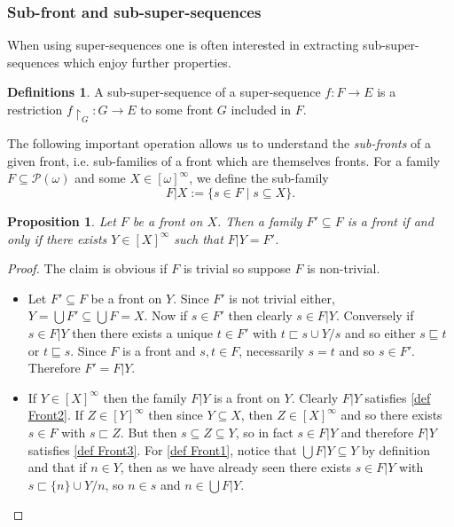 \documentclass{article}%
\theoremstyle{plain}
\newtheorem{proposition}[theorem]{Proposition}
\theoremstyle{definition}
\newtheorem{definition}[theorem]{Definition}
\newtheorem{definition}[theorem]{Notation}
\newtheorem{definition}[theorem]{Notations}
\newtheorem{definition}[theorem]{Definitions}
\theoremstyle{remark}
\newcommand{\restr}[1]{\mathord{\upharpoonright_{#1}}} %
\DeclareMathOperator{\base}{\mathord{\bigcup}}
\newcommand{\segm} {\sqsubseteq}
\newcommand{\segs} {\sqsubset}
\newcommand{\infSub}[1]{[#1]^{\infty}}
\begin{document}
\subsubsection{Sub-front and sub-super-sequences}

When using super-sequences one is often interested in extracting sub-super-sequences which enjoy further properties.

\begin{definition}
A sub-super-sequence of a super-sequence $f:F\to E$ is a restriction $f\restr{G}:G\to E$ to some front $G$ included in $F$.
\end{definition}


The following important operation allows us to understand the \emph{sub-fronts} of a given front, i.e. sub-families of a front which are themselves fronts. For a family $F\subseteq \mathcal{P}(\omega)$ and some $X\in\infSub{\omega}$, we define the sub-family
\[
F|X:=\{s\in F\mid s\subseteq X\}.
\]

\begin{proposition}
Let $F$ be a front on $X$. Then a family $F'\subseteq F$ is a front if and only if there exists $Y\in\infSub{X}$ such that $F|Y=F'$.
\end{proposition}
\begin{proof}
The claim is obvious if $F$ is trivial so suppose $F$ is non-trivial.
\begin{itemize}
\item[$\to$] Let $F'\subseteq F$ be a front on $Y$. Since $F'$ is not trivial either, $Y=\base F'\subseteq \base F=X$. Now if $s\in F'$ then clearly $s\in F|Y$. Conversely if $s\in F|Y$ then there exists a unique $t\in F'$ with $t\segs s \cup Y/s$ and so either $s\segm t$ or $t\segm s$. Since $F$ is a front and $s,t\in F$, necessarily $s=t$ and so $s\in F'$. Therefore $F'=F|Y$.
\item[$\leftarrow$] If $Y\in\infSub{X}$ then the family $F|Y$ is a front on $Y$. Clearly $F|Y$ satisfies \cref{def Front2}. If $Z\in \infSub{Y}$ then since $Y\subseteq X$, then $Z\in\infSub{X}$ and so there exists $s\in F$ with $s\segs Z$. But then $s\subseteq Z\subseteq Y$, so in fact $s\in F|Y$ and therefore $F|Y$ satisfies \cref{def Front3}. For \cref{def Front1}, notice that $\base F|Y\subseteq Y$ by definition and that if $n\in Y$, then as we have already seen there exists $s\in F|Y$ with $s\segs \{n\}\cup Y/n$, so $n\in s$ and $n\in \base F|Y$.   \qedhere
\end{itemize}
\end{proof}
\end{document}
